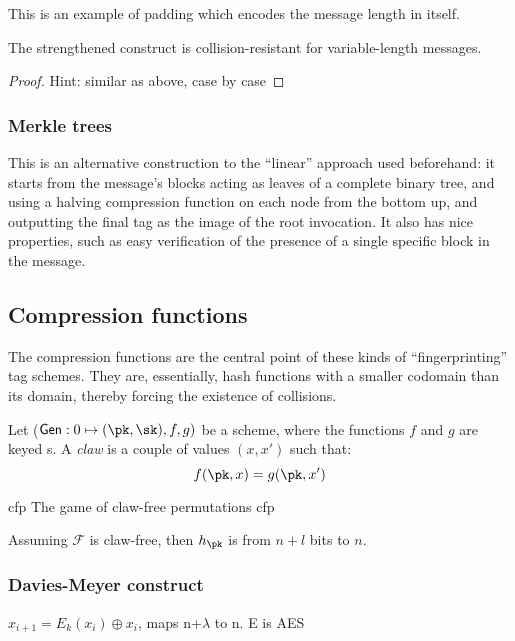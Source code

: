 This is an example of padding which encodes the message length in itself.

\begin{theorem}
    The strengthened construct is collision-resistant for variable-length messages.
\end{theorem}

\begin{proof}
    Hint: similar as above, case by case
\end{proof}

\subsubsection{Merkle trees}

This is an alternative construction to the ``linear'' approach used beforehand: it starts from the message's blocks acting as leaves of a complete binary tree, and using a halving compression function on each node from the bottom up, and outputting the final tag as the image of the root invocation. It also has nice properties, such as easy verification of the presence of a single specific block in the message.

\subsection{Compression functions}

The compression functions are the central point of these kinds of ``fingerprinting'' tag schemes. They are, essentially, hash functions with a smaller codomain than its domain, thereby forcing the existence of collisions.

Let ($\textsf{Gen} : 0 \mapsto (\pk, \sk), f, g)$ be a \pke{} scheme, where the functions $f$ and $g$ are keyed \prp{}s. A \emph{claw} is a couple of values $(x, x')$ such that:
\[
    f(\pk, x) = g(\pk, x')
\]

\begin{cryptogame}
    {cfp}
    {The game of claw-free permutations}
    {cfp}
    

\end{cryptogame}

\begin{theorem}
    Assuming $\mathcal{F}$ is claw-free, then $h_\pk$ is \crh{} from $n + l$ bits to $n$.
\end{theorem}

\subsubsection{Davies-Meyer construct}

\begin{definition}
    $x_{i + 1} = E_k(x_i) \oplus x_i$, maps n+$\lambda$ to n. E is AES
\end{definition}
